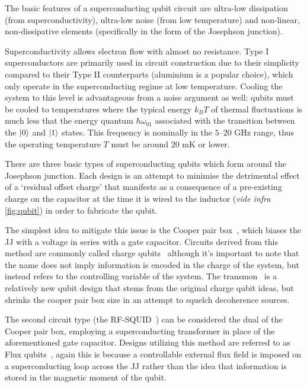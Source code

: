 The basic features of a superconducting qubit circuit are ultra-low dissipation (from superconductivity), ultra-low noise (from low temperature) and non-linear, non-dissipative elements (specifically in the form of the Josephson junction).

Superconductivity allows electron flow with almost no resistance.
Type I superconductors are primarily used in circuit construction due to their simplicity compared to their Type II counterparts (aluminium is a popular choice), which only operate in the superconducting regime at low temperature.
Cooling the system to this level is advantageous from a noise argument as well: qubits must be cooled to temperatures where the typical energy $k_B T$ of thermal fluctuations is much less that the energy quantum $\hbar \omega_{01}$ associated with the transition between the $\lvert0\rangle$ and $\lvert1\rangle$ states.
This frequency is nominally in the $5$--$20$ GHz range, thus the operating temperature $T$ must be around $20$ mK or lower.

There are three basic types of superconducting qubits which form around the Josephson junction.
Each design is an attempt to minimise the detrimental effect of a `residual offset charge' that manifests as a consequence of a pre-existing charge on the capacitor at the time it is wired to the inductor (\textit{vide infra} \cref{fig:qubit}) in order to fabricate the qubit.

The simplest idea to mitigate this issue is the Cooper pair box~\cite{Nakamura1999,Bouchiat1998}, which biases the JJ with a voltage in series with a gate capacitor.
Circuits derived from this method are commonly called charge qubits~\cite{Makhlin2001,Vion2002} although it's important to note that the name does not imply information is encoded in the charge of the system, but instead refers to the controlling variable of the system.
The transmon~\cite{Wallraff2004, Schreier2008} is a relatively new qubit design that stems from the original charge qubit ideas, but shrinks the cooper pair box size in an attempt to squelch decoherence sources.

The second circuit type (the RF-SQUID~\cite{Barone1982}) can be considered the dual of the Cooper pair box, employing a superconducting transformer in place of the aforementioned gate capacitor.
Designs utilizing this method are referred to as Flux qubits~\cite{Mooij1999,VanderWal2000,Chiorescu2003}, again this is because a controllable external flux field is imposed on a superconducting loop across the JJ rather than the idea that information is stored in the magnetic moment of the qubit.

